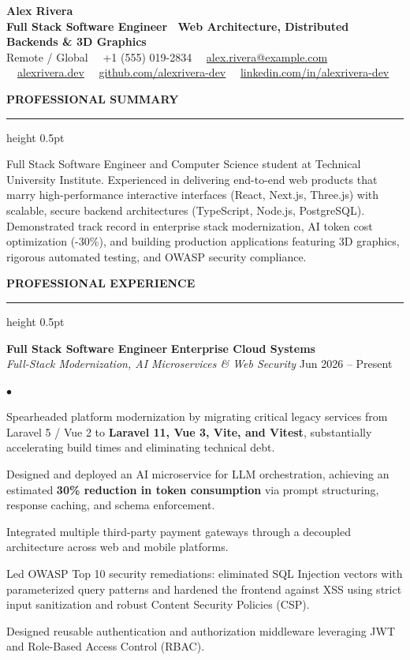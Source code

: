 \documentclass[10pt,letterpaper]{article}
\newcommand{\resumesection}[1]{%
  \vspace{2pt}%
  {\color{primary}\normalsize\bfseries\MakeUppercase{#1}}%
  \vspace{1pt}\hrule height 0.5pt\vspace{2pt}%
}
\renewenvironment{itemize}{%
  \begin{list}{\color{primary}$\bullet$}{%
    \setlength{\leftmargin}{1.1em}%
    \setlength{\itemsep}{0.5pt}%
    \setlength{\topsep}{1pt}%
    \setlength{\parsep}{0pt}%
    \setlength{\partopsep}{0pt}%
  }%
}{%
  \end{list}%
}
\begin{document}
\color{textdark}

\begin{center}
    {\LARGE \textbf{\color{primary} Alex Rivera}} \\ \vspace{1.5pt}
    {\large \textbf{Full Stack Software Engineer \textbar\ Web Architecture, Distributed Backends \& 3D Graphics}} \\ \vspace{2pt}
    {\small
        Remote / Global \ \textbullet \
        +1 (555) 019-2834 \ \textbullet \
        \href{mailto:alex.rivera@example.com}{alex.rivera@example.com} \ \textbullet \
        \href{https://alexrivera.dev}{alexrivera.dev} \ \textbullet \
        \href{https://github.com/alexrivera-dev}{github.com/alexrivera-dev} \ \textbullet \
        \href{https://linkedin.com/in/alexrivera-dev}{linkedin.com/in/alexrivera-dev}
    }
\end{center}

\vspace{-6pt}

\resumesection{Professional Summary}
{\small Full Stack Software Engineer and Computer Science student at Technical University Institute. Experienced in delivering end-to-end web products that marry high-performance interactive interfaces (React, Next.js, Three.js) with scalable, secure backend architectures (TypeScript, Node.js, PostgreSQL). Demonstrated track record in enterprise stack modernization, AI token cost optimization (-30\%), and building production applications featuring 3D graphics, rigorous automated testing, and OWASP security compliance.}

\resumesection{Professional Experience}

\textbf{Full Stack Software Engineer} \hfill \textbf{Enterprise Cloud Systems} \\
\textit{Full-Stack Modernization, AI Microservices \& Web Security} \hfill Jun 2026 -- Present
\begin{itemize}
    \item Spearheaded platform modernization by migrating critical legacy services from Laravel 5 / Vue 2 to \textbf{Laravel 11, Vue 3, Vite, and Vitest}, substantially accelerating build times and eliminating technical debt.
    \item Designed and deployed an AI microservice for LLM orchestration, achieving an estimated \textbf{30\% reduction in token consumption} via prompt structuring, response caching, and schema enforcement.
    \item Integrated multiple third-party payment gateways through a decoupled architecture across web and mobile platforms.
    \item Led OWASP Top 10 security remediations: eliminated SQL Injection vectors with parameterized query patterns and hardened the frontend against XSS using strict input sanitization and robust Content Security Policies (CSP).
    \item Designed reusable authentication and authorization middleware leveraging JWT and Role-Based Access Control (RBAC).
\end{itemize}
\end{document}
